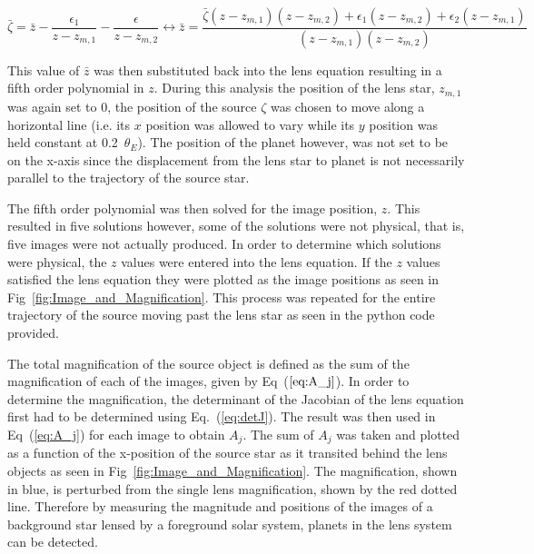\documentclass{article}
\begin{document}
\begin{equation}
\bar{\zeta}=\bar{z} - \frac{\epsilon_1}{z-z_{m,1}} - \frac{\epsilon}{z-z_{m,2}} \leftrightarrow \bar{z} =\frac{\bar{\zeta}(z-z_{m,1})(z-z_{m,2})+\epsilon_1(z-z_{m,2}) + \epsilon_2(z-z_{m,1})}{(z-z_{m,1})(z-z_{m,2})}
\label{eq:LensBar}
\end{equation}

\noindent This value of $\bar{z}$ was then substituted back into the lens equation resulting in a fifth order polynomial in $z$. During this analysis the position of the lens star, $z_{m,1}$ was again set to 0, the position of the source $\zeta$ was chosen to move along a horizontal line (i.e. its $x$ position was allowed to vary while its $y$ position was held constant at 0.2~$\theta_E$). The position of the planet however, was not set to be on the x-axis since the displacement from the lens star to planet is not necessarily parallel to the trajectory of the source star. 

The fifth order polynomial was then solved for the image position, $z$. This resulted in five solutions however, some of the solutions were not physical, that is, five images were not actually produced. In order to determine which solutions were physical, the $z$ values were entered into the lens equation. If the $z$ values satisfied the lens equation they were plotted as the image positions as seen in Fig~\ref{fig:Image_and_Magnification}. This process was repeated for the entire trajectory of the source moving past the lens star as seen in the python code provided.

The total magnification of the source object is defined as the sum of the magnification of each of the images, given by Eq~($\ref{eq:A_j}$). In order to determine the magnification, the determinant of the Jacobian of the lens equation first had to be determined using Eq.~(\ref{eq:detJ}). The result was then used in Eq~(\ref{eq:A_j}) for each image to obtain $A_j$. The sum of $A_j$ was taken and plotted as a function of the x-position of the source star as it transited behind the lens objects as seen in Fig~\ref{fig:Image_and_Magnification}. The magnification, shown in blue, is perturbed from the single lens magnification, shown by the red dotted line. Therefore by measuring the magnitude and positions of the images of a background star lensed by a foreground solar system, planets in the lens system can be detected.
\end{document}
